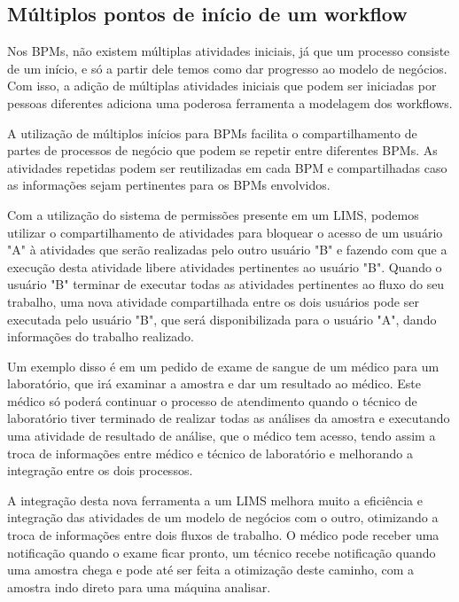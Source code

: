 \subsection{Múltiplos pontos de início de um workflow}




Nos BPMs, não existem múltiplas atividades iniciais, já que um processo consiste de um início, e só a partir dele temos como dar progresso ao modelo de negócios. Com isso, a adição de múltiplas atividades iniciais que podem ser iniciadas por pessoas diferentes adiciona uma poderosa ferramenta a modelagem dos workflows.


A utilização de múltiplos inícios para BPMs facilita o compartilhamento de partes de processos de negócio que podem se repetir entre diferentes BPMs. As atividades repetidas podem ser reutilizadas em cada BPM e compartilhadas caso as informações sejam pertinentes para os BPMs envolvidos.

Com a utilização do sistema de permissões presente em um LIMS, podemos utilizar o compartilhamento de atividades para bloquear o acesso de um usuário "A" à atividades que serão realizadas pelo outro usuário "B" e fazendo com que a execução desta atividade libere atividades pertinentes ao usuário "B". Quando o usuário "B" terminar de executar todas as atividades pertinentes ao fluxo do seu trabalho, uma nova atividade compartilhada entre os dois usuários pode ser executada pelo usuário "B", que será disponibilizada para o usuário "A", dando informações do trabalho realizado.

Um exemplo disso é em um pedido de exame de sangue de um médico para um laboratório, que irá examinar a amostra e dar um resultado ao médico. Este médico só poderá continuar o processo de atendimento quando o técnico de laboratório tiver terminado de realizar todas as análises da amostra e executando uma atividade de resultado de análise, que o médico tem acesso, tendo assim a troca de informações entre médico e técnico de laboratório e melhorando a integração entre os dois processos.


A integração desta nova ferramenta a um LIMS melhora muito a eficiência e integração das atividades de um modelo de negócios com o outro, otimizando a troca de informações entre dois fluxos de trabalho. O médico pode receber uma notificação quando o exame ficar pronto, um técnico recebe notificação quando uma amostra chega e pode até ser feita a otimização deste caminho, com a amostra indo direto para uma máquina analisar.


